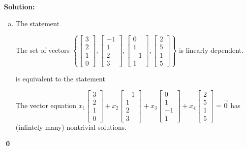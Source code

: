 \documentclass{article}
\newenvironment{solution}
{
  \ignorespaces
  \textbf{Solution:}
}
{
  \ignorespacesafterend
  \begin{flushright}
  {\bfseries \qed}
  \end{flushright}
}
\begin{document}
\begin{solution}
\begin{enumerate}[(a)]
\item 
The statement
\begin{center}\begin{minipage}{0.8\textwidth}
The set of vectors
\(\left\{
 \begin{bmatrix} 3 \\ 2 \\ 1 \\ 0 \end{bmatrix}  ,
 \begin{bmatrix} -1 \\ 1 \\ 2 \\ 3 \end{bmatrix}  ,
 \begin{bmatrix} 0 \\ 1 \\ -1 \\ 1 \end{bmatrix}  , 
 \begin{bmatrix} 2 \\ 5 \\ 1 \\ 5 \end{bmatrix} \right\}\)
is linearly dependent.
\end{minipage}\end{center}
is equivalent to the statement
\begin{center}\begin{minipage}{0.8\textwidth}
The vector equation
\( x_1\begin{bmatrix} 3 \\ 2 \\ 1 \\ 0 \end{bmatrix} +
 x_2\begin{bmatrix} -1 \\ 1 \\ 2 \\ 3 \end{bmatrix} +
 x_3\begin{bmatrix} 0 \\ 1 \\ -1 \\ 1 \end{bmatrix}+ 
 x_4\begin{bmatrix} 2 \\ 5 \\ 1 \\ 5 \end{bmatrix} =\vec{0}\)
has (infintely many) nontrivial solutions. 
\end{minipage}\end{center}


\end{enumerate}
\end{solution}
\end{document}
